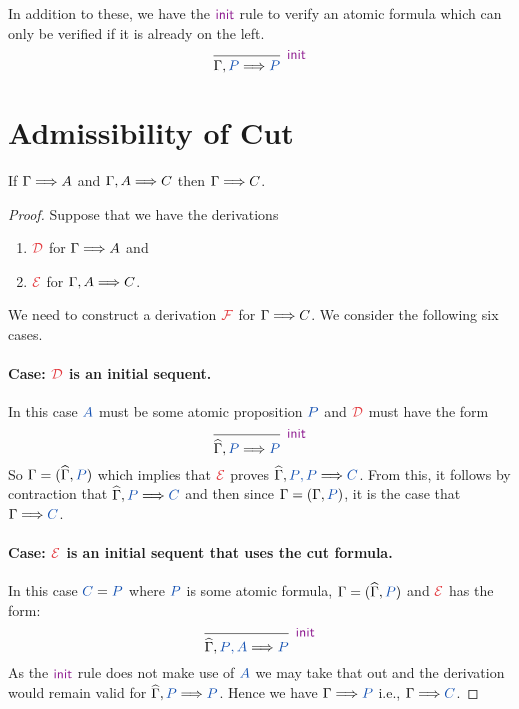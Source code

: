 In addition to these, we have the $\initRule$ rule to verify an atomic formula
which can only be verified if it is already on the left.
\[
  \begin{prooftree}
    \infer0[$\initRule$]{\sequent[\prp{P}]{\prp{P}}}
  \end{prooftree}
\]

\section{Admissibility of Cut}

\begin{theorem}[Cut]
  If $\sequent{A}$ and $\sequent[A]{C}$ then $\sequent{C}$.
\end{theorem}
\begin{proof}
  Suppose that we have the derivations
  \begin{enumerate}
    \item $\prf{D}$ for $\sequent{A}$ and
    \item $\prf{E}$ for $\sequent[A]{C}$.
  \end{enumerate}
  We need to construct a derivation $\prf{F}$ for $\sequent{}{C}$.
  We consider the following six cases.

  \paragraph{Case: $\prf{D}$ is an initial sequent.} In this case
  $\prp{A}$ must be some atomic proposition $\prp{P}$ and $\prf{D}$
  must have the form
  \[
      \begin{prooftree}
        \infer0[$\initRule$]{\sequentHat[P]{P}}
      \end{prooftree}
  \]
  So $\Gamma = (\widehat{\Gamma}, \prp{P})$ which implies that $\prf{E}$ proves
  $\sequentHat[\prp{P}, \prp{P}]{C}$. From this, it follows by contraction
  that $\sequentHat[\prp{P}]{C}$ and then since $\Gamma = (\Gamma, \prp{P})$,
  it is the case that $\sequent{\prp{C}}$.

  \paragraph{Case: $\prf{E}$ is an initial sequent that uses the cut formula.}
  In this case $\prp{C} = \prp{P}$ where $\prp{P}$ is some atomic formula,
  $\Gamma = (\widehat{\Gamma}, \prp{P})$ and $\prf{E}$ has the form:
  \[
    \begin{prooftree}
      \infer0[$\initRule$]{\sequentHat[\prp{P}, \prp{A}]{\prp{P}}}
    \end{prooftree}
  \]
  As the $\initRule$ rule does not make use of $\prp{A}$ we may take that out
  and the derivation would remain valid for $\sequentHat[\prp{P}]{\prp{P}}$.
  Hence we have $\sequent{\prp{P}}$ i.e., $\sequent{\prp{C}}$.


\end{proof}
